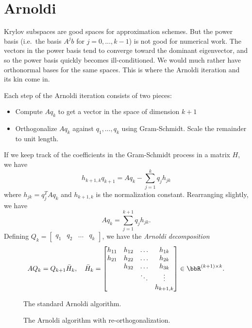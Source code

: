 \documentclass[12pt, leqno]{article} %
\begin{document}

\section{Arnoldi}

Krylov subspaces are good spaces for approximation schemes.  But the
power basis (i.e.~the basis $A^j b$ for $j = 0, \ldots, k-1$) is not
good for numerical work.  The vectors in the power basis tend to
converge toward the dominant eigenvector, and so the power basis quickly
becomes ill-conditioned.  We would much rather have orthonormal bases
for the same spaces.  This is where the Arnoldi iteration and its kin
come in.

Each step of the Arnoldi iteration consists of two pieces:
\begin{itemize}
\item
  Compute $Aq_k$ to get a vector in the space of dimension $k+1$
\item
  Orthogonalize $Aq_k$ against $q_1, \ldots, q_k$ using Gram-Schmidt.
  Scale the remainder to unit length.
\end{itemize}
If we keep track of the coefficients in the Gram-Schmidt process
in a matrix $H$, we have
\[
  h_{k+1,k} q_{k+1} = Aq_k - \sum_{j=1}^{k} q_j h_{jk}
\]
where $h_{jk} = q_j^T A q_k$ and $h_{k+1,k}$ is the normalization
constant.  Rearranging slightly, we have
\[
  Aq_k = \sum_{j=1}^{k+1} q_j h_{jk}.
\]
Defining $Q_k = \begin{bmatrix} q_1 & q_2 & \ldots & q_k \end{bmatrix}$,
we have the {\em Arnoldi decomposition}
\[
  AQ_k = Q_{k+1} \bar{H}_k, \quad
  \bar{H}_k =
  \begin{bmatrix}
    h_{11} & h_{12} & \ldots & h_{1k} \\
    h_{21} & h_{22} & \ldots & h_{2k} \\
           & h_{32} & \ldots & h_{3k} \\
           &        & \ddots & \vdots \\
           &        &        & h_{k+1,k}
  \end{bmatrix} \in \bbR^{(k+1) \times k}.
\]
\begin{figure}

\caption{The standard Arnoldi algorithm.}
\label{arnoldi-1}
\end{figure}

\begin{figure}

\caption{The Arnoldi algorithm with re-orthogonalization.}
\label{arnoldi-2}
\end{figure}
\end{document}
